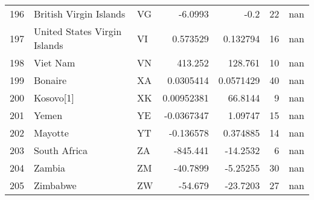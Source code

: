 \begin{tabular}{rllrrrr}
 196 & British Virgin Islands             & VG         &   -6.0993     &   -0.2        &     22 &    nan       \\
 197 & United States Virgin Islands       & VI         &    0.573529   &    0.132794   &     16 &    nan       \\
 198 & Viet Nam                           & VN         &  413.252      &  128.761      &     10 &    nan       \\
 199 & Bonaire                            & XA         &    0.0305414  &    0.0571429  &     40 &    nan       \\
 200 & Kosovo[1]                          & XK         &    0.00952381 &   66.8144     &      9 &    nan       \\
 201 & Yemen                              & YE         &   -0.0367347  &    1.09747    &     15 &    nan       \\
 202 & Mayotte                            & YT         &   -0.136578   &    0.374885   &     14 &    nan       \\
 203 & South Africa                       & ZA         & -845.441      &  -14.2532     &      6 &    nan       \\
 204 & Zambia                             & ZM         &  -40.7899     &   -5.25255    &     30 &    nan       \\
 205 & Zimbabwe                           & ZW         &  -54.679      &  -23.7203     &     27 &    nan       \\
\hline
\end{tabular}
